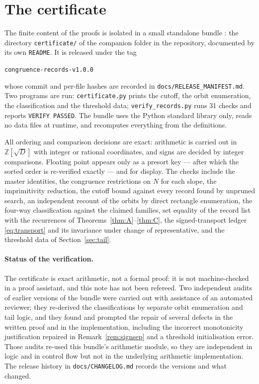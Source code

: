 \documentclass[11pt]{article}
\theoremstyle{definition}
\theoremstyle{remark}
\newcommand{\Z}{\mathbb{Z}}
\begin{document}
\section{The certificate}\label{sec:cert}

The finite content of the proofs is isolated in a small standalone bundle
: the directory \texttt{certificate/} of the companion
folder in the repository, documented by its own \texttt{README}. It is released under the tag
\begin{center}\texttt{congruence-records-v1.0.0}\end{center}
\noindent whose commit and per-file hashes are recorded in
\texttt{docs/RELEASE\_MANIFEST.md}. Two programs are run:
\texttt{certificate.py} prints the cutoff, the orbit enumeration, the classification and the
threshold data; \texttt{verify\_records.py} runs 31 checks and reports \texttt{VERIFY PASSED}.
The bundle uses the Python standard library only, reads no data files at runtime, and
recomputes everything from the definitions.

All ordering and comparison decisions are exact: arithmetic is carried out in $\Z[\sqrt D]$ with
integer or rational coordinates, and signs are decided by integer comparisons. Floating point
appears only as a presort key --- after which the sorted order is re-verified exactly --- and for
display. The checks include the master identities, the congruence restrictions on $N$ for each
slope, the imprimitivity reduction, the cutoff bound against every record found by unpruned
search, an independent recount of the orbits by direct rectangle enumeration, the four-way
classification against the claimed families, set equality of the record list with the
recurrences of Theorems~\ref{thm:A}--\ref{thm:C}, the signed-transport ledger
\eqref{eq:transport} and its invariance under change of representative, and the threshold data
of Section~\ref{sec:tail}.

\paragraph{Status of the verification.}
The certificate is exact arithmetic, not a formal proof: it is not machine-checked in a proof
assistant, and this note has not been refereed. Two independent audits of earlier versions of
the bundle were carried out with assistance of an automated reviewer; they re-derived the
classifications by separate orbit enumeration and tail logic, and they found and prompted the
repair of several defects in the written proof and in the implementation, including the
incorrect monotonicity justification repaired in Remark~\ref{rem:signsep} and a threshold
initialisation error. Those audits re-used this bundle's arithmetic module, so they are
independent in logic and in control flow but not in the underlying arithmetic implementation.
The release history in \texttt{docs/CHANGELOG.md} records the versions and what changed.
\end{document}
